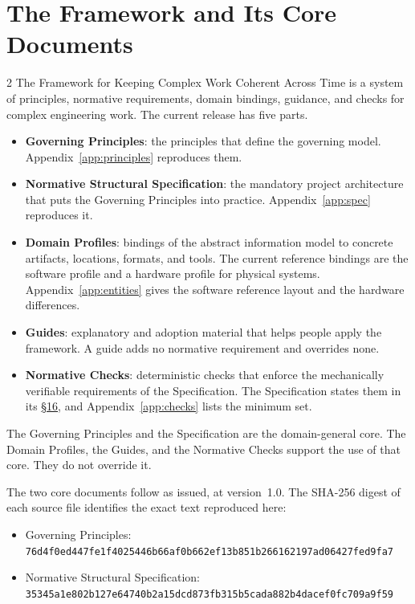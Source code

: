 \section{The Framework and Its Core Documents}
\label{app:framework}

\begin{multicols}{2}
The Framework for Keeping Complex Work Coherent Across Time is a system of principles, normative requirements, domain bindings, guidance, and checks for complex engineering work. The current release has five parts.

\begin{itemize}\setlength{\itemsep}{0pt}\setlength{\parskip}{0pt}
\item \textbf{Governing Principles}: the principles that define the governing model. Appendix~\ref{app:principles} reproduces them.
\item \textbf{Normative Structural Specification}: the mandatory project architecture that puts the Governing Principles into practice. Appendix~\ref{app:spec} reproduces it.
\item \textbf{Domain Profiles}: bindings of the abstract information model to concrete artifacts, locations, formats, and tools. The current reference bindings are the software profile and a hardware profile for physical systems. Appendix~\ref{app:entities} gives the software reference layout and the hardware differences.
\item \textbf{Guides}: explanatory and adoption material that helps people apply the framework. A guide adds no normative requirement and overrides none.
\item \textbf{Normative Checks}: deterministic checks that enforce the mechanically verifiable requirements of the Specification. The Specification states them in its \hyperlink{nss-16}{\S16}, and Appendix~\ref{app:checks} lists the minimum set.
\end{itemize}

The Governing Principles and the Specification are the domain-general core. The Domain Profiles, the Guides, and the Normative Checks support the use of that core. They do not override it.
\end{multicols}

The two core documents follow as issued, at version~1.0. The SHA-256 digest of each source file identifies the exact text reproduced here:

\begin{itemize}\setlength{\itemsep}{0pt}\setlength{\parskip}{0pt}
\item Governing Principles: {\footnotesize\texttt{76d4f0ed447fe1f4025446b66af0b662ef13b851b266162197ad06427fed9fa7}}
\item Normative Structural Specification: {\footnotesize\texttt{35345a1e802b127e64740b2a15dcd873fb315b5cada882b4dacef0fc709a9f59}}
\end{itemize}

